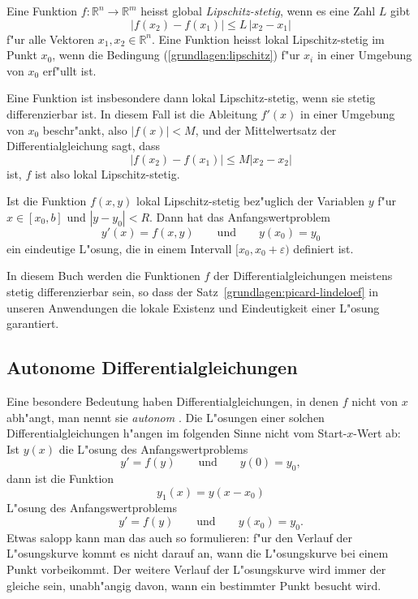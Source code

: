 \begin{definition}
Eine Funktion $f\colon \mathbb R^n\to\mathbb R^m$ heisst global
{\em Lipschitz-stetig},
wenn es eine Zahl $L$ gibt 
\begin{equation}
|f(x_2)-f(x_1)| \le L\,|x_2-x_1|
\label{grundlagen:lipschitz}
\end{equation}
f"ur alle Vektoren $x_1,x_2\in\mathbb R^n$.
Eine Funktion heisst lokal Lipschitz-stetig im Punkt $x_0$, wenn die
Bedingung (\ref{grundlagen:lipschitz}) f"ur $x_i$ in einer Umgebung von
$x_0$ erf"ullt ist.
\end{definition}

Eine Funktion ist insbesondere dann lokal Lipschitz-stetig, wenn sie
stetig differenzierbar ist.
In diesem Fall ist die Ableitung $f'(x)$ in einer Umgebung von $x_0$
beschr"ankt, also $|f(x)|<M$, und der Mittelwertsatz der Differentialgleichung
sagt, dass
\[
|f(x_2)-f(x_1)|\le M |x_2-x_2|
\]
ist, $f$ ist also lokal Lipschitz-stetig.

\begin{satz}
\label{grundlagen:picard-lindeloef}
Ist die Funktion $f(x,y)$ lokal Lipschitz-stetig bez"uglich der Variablen
$y$ f"ur $x\in[x_0,b]$ und $|y-y_0|<R$.
Dann hat das Anfangswertproblem
\[
y'(x)=f(x,y)\qquad\text{und}\qquad y(x_0)=y_0
\]
ein eindeutige L"osung, die in einem Intervall $[x_0,x_0+\varepsilon)$
definiert ist.
\end{satz}

In diesem Buch werden die Funktionen $f$ der Differentialgleichungen 
meistens stetig differenzierbar sein, so dass der
Satz~\ref{grundlagen:picard-lindeloef} in unseren Anwendungen die lokale
Existenz und Eindeutigkeit einer L"osung garantiert.

\subsection{Autonome Differentialgleichungen}
Eine besondere Bedeutung haben Differentialgleichungen, in denen
$f$ nicht von $x$ abh"angt, man nennt sie {\em autonom}
.
Die L"osungen einer solchen Differentialgleichungen h"angen im
folgenden Sinne nicht vom Start-$x$-Wert ab:
Ist $y(x)$ die L"osung des Anfangswertproblems
\[
y'=f(y)\qquad\text{und}\qquad y(0)=y_0,
\]
dann ist die Funktion
\[
y_1(x)=y(x-x_0)
\]
L"osung des Anfangswertproblems
\[
y'=f(y)\qquad\text{und}\qquad y(x_0)=y_0.
\]
Etwas salopp kann man das auch so formulieren: f"ur den Verlauf der 
L"osungskurve kommt es nicht darauf an, wann die L"osungskurve bei 
einem Punkt vorbeikommt.
Der weitere Verlauf der L"osungskurve wird immer der gleiche sein,
unabh"angig davon, wann ein bestimmter Punkt besucht wird.

